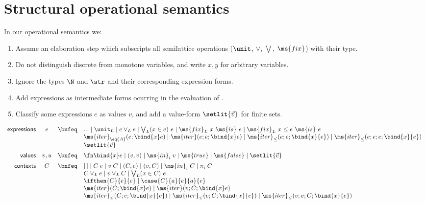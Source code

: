 \documentclass{article}
\newcommand{\hole}{[\,]}
\newcommand{\tforin}[2]{\bigvee_{#1}(#2)\ }
\newcommand{\tfix}[2]{\ms{fix}_{#1}~{#2}~\ms{is}~}
\newcommand{\tfixle}[3]{\tfix{#1}{#2 \le #3}}
\newcommand{\iter}[3]{\ms{iter}({#1}; \bind{#2}#3)}
\newcommand{\iterstep}[4]{\ms{iter}({#1}; {#2}; {\bind{#3}#4})}
\newcommand{\iterle}[4]{\ms{iter}_\le({#1}; {#2}; \bind{#3}{#4})}
\newcommand{\iterlestep}[5]{\ms{iter}_\le({#1}; {#2}; {#3}; \bind{#4}{#5})}
\begin{document}
\section{Structural operational semantics}

In our operational semantics we:
\begin{enumerate}
\item Assume an elaboration step which subscripts all semilattice operations
($\unit$, $\vee$, $\bigvee$, $\ms{fix}$) with their type.
\item Do not distinguish discrete from monotone variables, and write $x,y$ for
  arbitrary variables.
\item Ignore the types $\N$ and $\str$ and their corresponding expression forms.
\item Add 
expressions as intermediate forms ocurring in the evaluation of .
\item Classify some expressions $e$ as values $v$, and add a value-form
  $\setlit{\vec{v}}$ for finite sets.
\end{enumerate}

\[\begin{array}{rccl}
  \textsf{expressions} & e
  &\bnfeq& ... \pipe \unit_L \pipe e \vee_L e \pipe \tforin{L}{x \in e} e
  \pipe \tfix{L}{x}{e} \pipe \tfixle{L}{x}{e}{e}\\
  &&& \ms{iter}_{\eq{A}}(e; \bind{x} e) \pipe \iterstep{e}{e}{x}{e}
  \pipe \iterle{e}{e}{x}{e} \pipe \iterlestep{e}{e}{e}{x}{e}\\
  &&& \setlit{\vec{v}}
  \vspace{0.5em}\\
  \textsf{values} & v,u
  &\bnfeq& \fn\bind{x} e \pipe (v, v) \pipe \ms{in}_i\; v
  \pipe \ms{true} \pipe \ms{false} \pipe \setlit{\vec{v}}
  \vspace{0.5em}\\
  \textsf{contexts} & C
  &\bnfeq& \hole \pipe C\;e \pipe v\;C \pipe (C, e) \pipe (v, C) \pipe \ms{in}_i\;C
  \pipe \pi_i \; C\\
  &&& C \vee_L e \pipe v \vee_L C \pipe \tforin{L}{x \in C} e\\
  &&& \ifthen{C}{e}{e} \pipe \case{C}{a}{e}{a}{e}\\
  &&& \iter{C}{x}{e} \pipe \iterstep{v}{C}{x}{e}\\
  &&& \iterle{C}{e}{x}{e} \pipe \iterle{v}{C}{x}{e}
  \pipe \iterlestep{v}{v}{C}{x}{e}
\end{array}\]
\end{document}
